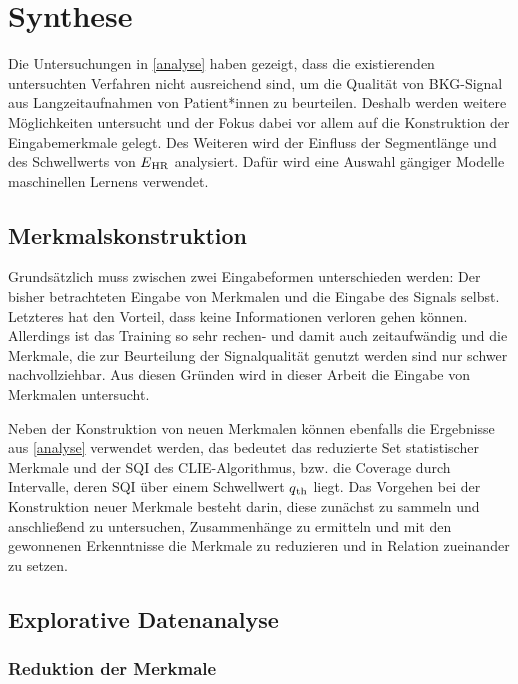 \chapter{Synthese}

Die Untersuchungen in \ref{analyse} haben gezeigt, dass die existierenden untersuchten Verfahren nicht ausreichend sind, um die Qualität von \ac{BKG}-Signal aus Langzeitaufnahmen von Patient*innen zu beurteilen. Deshalb werden weitere Möglichkeiten untersucht und der Fokus dabei vor allem auf die Konstruktion der Eingabemerkmale gelegt. Des Weiteren wird der Einfluss der Segmentlänge und des Schwellwerts von $E\textsubscript{HR}$ analysiert. Dafür wird eine Auswahl gängiger Modelle maschinellen Lernens verwendet.

\section{Merkmalskonstruktion}

Grundsätzlich muss zwischen zwei Eingabeformen unterschieden werden: Der bisher betrachteten Eingabe von Merkmalen und die Eingabe des Signals selbst. Letzteres hat den Vorteil, dass keine Informationen verloren gehen können. Allerdings ist das Training so sehr rechen- und damit auch zeitaufwändig und die Merkmale, die zur Beurteilung der Signalqualität genutzt werden sind nur schwer nachvollziehbar. Aus diesen Gründen wird in dieser Arbeit die Eingabe von Merkmalen untersucht.

Neben der Konstruktion von neuen Merkmalen können ebenfalls die Ergebnisse aus \ref{analyse} verwendet werden, das bedeutet das reduzierte Set statistischer Merkmale und der \ac{SQI} des \ac{CLIE}-Algorithmus, bzw. die Coverage durch Intervalle, deren \ac{SQI} über einem Schwellwert $q\textsubscript{th}$ liegt. Das Vorgehen bei der Konstruktion neuer Merkmale besteht darin, diese zunächst zu sammeln und anschließend zu untersuchen, Zusammenhänge zu ermitteln und mit den gewonnenen Erkenntnisse die Merkmale zu reduzieren und in Relation zueinander zu setzen.


\section{Explorative Datenanalyse}

\subsection{Reduktion der Merkmale}

